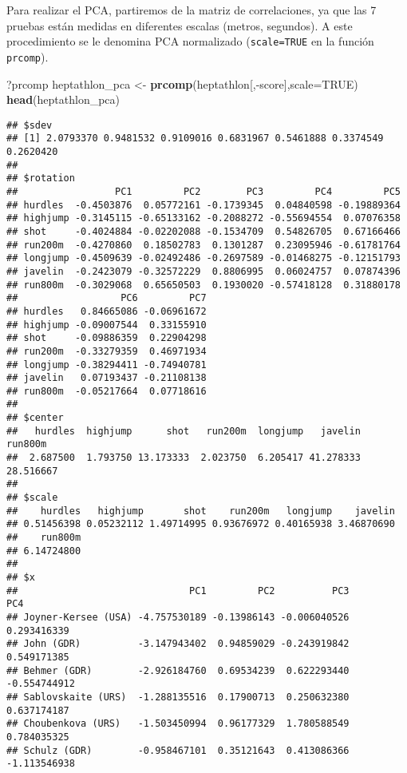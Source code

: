 \documentclass[]{article}
\newenvironment{Shaded}{\begin{snugshade}}{\end{snugshade}}
\newcommand{\KeywordTok}[1]{\textcolor[rgb]{0.13,0.29,0.53}{\textbf{{#1}}}}
\newcommand{\DataTypeTok}[1]{\textcolor[rgb]{0.13,0.29,0.53}{{#1}}}
\newcommand{\StringTok}[1]{\textcolor[rgb]{0.31,0.60,0.02}{{#1}}}
\newcommand{\OtherTok}[1]{\textcolor[rgb]{0.56,0.35,0.01}{{#1}}}
\newcommand{\NormalTok}[1]{{#1}}
\numberwithin{equation}{section}
\begin{document}
Para realizar el PCA, partiremos de la matriz de correlaciones, ya que
las 7 pruebas están medidas en diferentes escalas (metros, segundos). A
este procedimiento se le denomina PCA normalizado (\texttt{scale=TRUE}
en la función \texttt{prcomp}).

\begin{Shaded}
\begin{Highlighting}[]
\NormalTok{?prcomp}
\NormalTok{heptathlon_pca <-}\StringTok{ }\KeywordTok{prcomp}\NormalTok{(heptathlon[,-score],}\DataTypeTok{scale=}\OtherTok{TRUE}\NormalTok{)}
\KeywordTok{head}\NormalTok{(heptathlon_pca)}
\end{Highlighting}
\end{Shaded}

\begin{verbatim}
## $sdev
## [1] 2.0793370 0.9481532 0.9109016 0.6831967 0.5461888 0.3374549 0.2620420
## 
## $rotation
##                 PC1         PC2        PC3         PC4         PC5
## hurdles  -0.4503876  0.05772161 -0.1739345  0.04840598 -0.19889364
## highjump -0.3145115 -0.65133162 -0.2088272 -0.55694554  0.07076358
## shot     -0.4024884 -0.02202088 -0.1534709  0.54826705  0.67166466
## run200m  -0.4270860  0.18502783  0.1301287  0.23095946 -0.61781764
## longjump -0.4509639 -0.02492486 -0.2697589 -0.01468275 -0.12151793
## javelin  -0.2423079 -0.32572229  0.8806995  0.06024757  0.07874396
## run800m  -0.3029068  0.65650503  0.1930020 -0.57418128  0.31880178
##                  PC6         PC7
## hurdles   0.84665086 -0.06961672
## highjump -0.09007544  0.33155910
## shot     -0.09886359  0.22904298
## run200m  -0.33279359  0.46971934
## longjump -0.38294411 -0.74940781
## javelin   0.07193437 -0.21108138
## run800m  -0.05217664  0.07718616
## 
## $center
##   hurdles  highjump      shot   run200m  longjump   javelin   run800m 
##  2.687500  1.793750 13.173333  2.023750  6.205417 41.278333 28.516667 
## 
## $scale
##    hurdles   highjump       shot    run200m   longjump    javelin 
## 0.51456398 0.05232112 1.49714995 0.93676972 0.40165938 3.46870690 
##    run800m 
## 6.14724800 
## 
## $x
##                              PC1         PC2          PC3          PC4
## Joyner-Kersee (USA) -4.757530189 -0.13986143 -0.006040526  0.293416339
## John (GDR)          -3.147943402  0.94859029 -0.243919842  0.549171385
## Behmer (GDR)        -2.926184760  0.69534239  0.622293440 -0.554744912
## Sablovskaite (URS)  -1.288135516  0.17900713  0.250632380  0.637174187
## Choubenkova (URS)   -1.503450994  0.96177329  1.780588549  0.784035325
## Schulz (GDR)        -0.958467101  0.35121643  0.413086366 -1.113546938

\end{verbatim}
\end{document}
